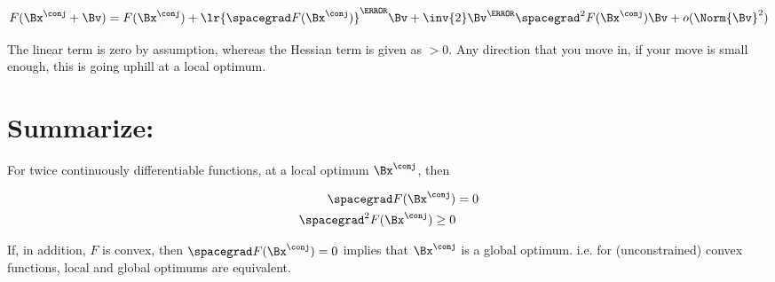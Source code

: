 \begin{dmath}\label{eqn:convexOptimizationLecture8:20}
F(\Bx^\conj + \Bv) = F(\Bx^\conj) + \lr{ \spacegrad F(\Bx^\conj)}^\T \Bv + \inv{2} \Bv^\T \spacegrad^2 F(\Bx^\conj) \Bv + o(\Norm{\Bv}^2)
\end{dmath}

The linear term is zero by assumption, whereas the Hessian term is given as \( > 0 \).  Any direction that you move in, if your move is small enough, this is going uphill at a local optimum.

\section{Summarize:}

For twice continuously differentiable functions, at a local optimum \( \Bx^\conj \), then

\begin{dmath}\label{eqn:convexOptimizationLecture8:40}
\begin{aligned}
\spacegrad F(\Bx^\conj) &= 0 \\
\spacegrad^2 F(\Bx^\conj) \ge 0
\end{aligned}
\end{dmath}

If, in addition, \( F \) is convex, then \( \spacegrad F(\Bx^\conj) = 0 \) implies that \( \Bx^\conj \) is a global optimum.  i.e. for (unconstrained) convex functions, local and global optimums are equivalent.

